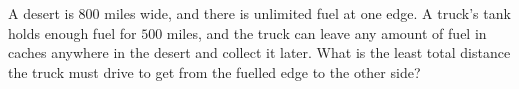 A desert is $800$ miles wide, and there is unlimited fuel at one edge. A truck's tank holds enough fuel for $500$ miles, and the truck can leave any amount of fuel in caches anywhere in the desert and collect it later. What is the least total distance the truck must drive to get from the fuelled edge to the other side?
